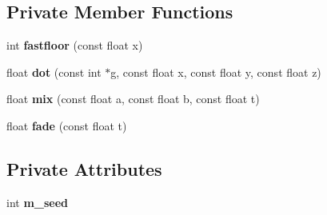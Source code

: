 \subsection*{Private Member Functions}
\begin{DoxyCompactItemize}
\item 
\mbox{\label{classflounder_1_1noiseclassic_a9d44cb2e2a3ce943634d8f2ed7f69495}} 
int {\bfseries fastfloor} (const float x)
\item 
\mbox{\label{classflounder_1_1noiseclassic_a578536e54b92030ad3cdbc26dcd4c1e7}} 
float {\bfseries dot} (const int $\ast$g, const float x, const float y, const float z)
\item 
\mbox{\label{classflounder_1_1noiseclassic_a6179aab18ad6083380dd7ad15ab2eeae}} 
float {\bfseries mix} (const float a, const float b, const float t)
\item 
\mbox{\label{classflounder_1_1noiseclassic_adf329775969998d8414cc39f32f2960d}} 
float {\bfseries fade} (const float t)
\end{DoxyCompactItemize}
\subsection*{Private Attributes}
\begin{DoxyCompactItemize}
\item 
\mbox{\label{classflounder_1_1noiseclassic_afbc73ca9fe951b1efdf67ee29e54ebde}} 
int {\bfseries m\+\_\+seed}
\end{DoxyCompactItemize}
